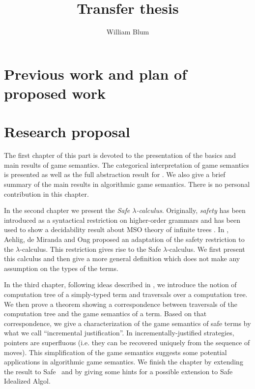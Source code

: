 \documentclass[nocenter,sfbold]{thesis}
\author{William Blum}
\title{Transfer thesis}
\begin{document}
\maketitle \tableofcontents

\part{Previous work and plan of proposed work}




\part{Research proposal}

The first chapter of this part is devoted to the presentation of the
basics and main results of game semantics. The categorical
interpretation of game semantics is presented as well as the full
abstraction result for \pcf. We also give a brief summary of the
main results in algorithmic game semantics. There is no personal
contribution in this chapter.

In the second chapter we present the \emph{Safe $\lambda$-calculus}.
Originally, \emph{safety} has been introduced as a syntactical
restriction on higher-order grammars and has been used to show a
decidability result about MSO theory of infinite trees
\citep{KNU02}. In \cite{safety-mirlong2004}, Aehlig, de Miranda and
Ong  proposed an adaptation of the safety restriction to the
$\lambda$-calculus. This restriction gives rise to the Safe
$\lambda$-calculus. We first present this calculus and then give a
more general definition which does not make any assumption on the
types of the terms.

In the third chapter, following ideas described in
\cite{OngLics2006}, we introduce the notion of computation tree of a
simply-typed term and traversals over a computation tree. We then
prove a theorem showing a correspondence between traversals of the
computation tree and the game semantics of a term. Based on that
correspondence, we give a characterization of the game semantics of
safe terms by what we call ``incremental justification''. In
incrementally-justified strategies, pointers are superfluous (i.e.
they can be recovered uniquely from the sequence of moves). This
simplification of the game semantics suggests some potential
applications in algorithmic game semantics. We finish the chapter by
extending the result to Safe \pcf\ and by giving some hints for a
possible extension to Safe Idealized Algol.
\end{document}
